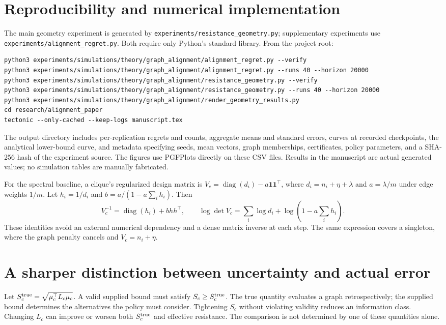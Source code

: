 \documentclass[11pt]{article}
\newcommand{\one}{\symbf{1}}
\newcommand{\diag}{\operatorname{diag}}
\begin{document}
\section{Reproducibility and numerical implementation}
The main geometry experiment is generated by
\texttt{experiments/resistance\_geometry.py}; supplementary experiments use
\texttt{experiments/alignment\_regret.py}. Both require only Python's standard library. From the project root:
\begin{verbatim}
python3 experiments/simulations/theory/graph_alignment/alignment_regret.py --verify
python3 experiments/simulations/theory/graph_alignment/alignment_regret.py --runs 40 --horizon 20000
python3 experiments/simulations/theory/graph_alignment/resistance_geometry.py --verify
python3 experiments/simulations/theory/graph_alignment/resistance_geometry.py --runs 40 --horizon 20000
python3 experiments/simulations/theory/graph_alignment/render_geometry_results.py
cd research/alignment_paper
tectonic --only-cached --keep-logs manuscript.tex
\end{verbatim}
The output directory includes per-replication regrets and counts, aggregate means and standard errors, curves at recorded checkpoints, the analytical lower-bound curve, and metadata specifying seeds, mean vectors, graph memberships, certificates, policy parameters, and a SHA-256 hash of the experiment source. The figures use PGFPlots directly on these CSV files. Results in the manuscript are actual generated values; no simulation tables are manually fabricated.

For the spectral baseline, a clique's regularized design matrix is
$V_c=\diag(d_i)-a\one\one^\top$, where $d_i=n_i+\eta+\lambda$ and $a=\lambda/m$ under edge weights $1/m$. Let $h_i=1/d_i$ and $b=a/(1-a\sum_i h_i)$. Then
\begin{equation}
 V_c^{-1}=\diag(h_i)+b hh^\top,\qquad
 \log\det V_c=\sum_i\log d_i+\log(1-a\sum_i h_i).
\end{equation}
These identities avoid an external numerical dependency and a dense matrix inverse at each step. The same expression covers a singleton, where the graph penalty cancels and $V_c=n_i+\eta$.

\section{A sharper distinction between uncertainty and actual error}
Let $S_c^{\rm true}=\sqrt{\mu_c^\top L_c\mu_c}$. A valid supplied bound must satisfy $S_c\ge S_c^{\rm true}$. The true quantity evaluates a graph retrospectively; the supplied bound determines the alternatives the policy must consider. Tightening $S_c$ without violating validity reduces an information class. Changing $L_c$ can improve or worsen both $S_c^{\rm true}$ and effective resistance. The comparison is not determined by one of these quantities alone.
\end{document}
